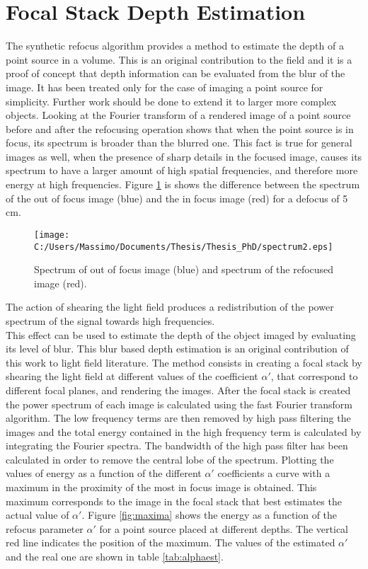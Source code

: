 \section{Focal Stack Depth Estimation} 
The synthetic refocus algorithm provides a method to estimate the depth of a point source in a volume. This is an original contribution to the field and it is a proof of concept that depth information can be evaluated from the blur of the image. It has been treated only for the case of imaging a point source for simplicity. Further work should be done to extend it to larger more complex objects. Looking at the Fourier transform of a rendered image of a point source before and after the refocusing operation shows that when the point source is in focus, its spectrum is broader than the blurred one. This fact is true for general images as well, when the presence of sharp details in the focused image, causes its spectrum to have a larger amount of high spatial frequencies, and therefore more energy at high frequencies. Figure \ref{fig:spec1} is shows the difference between the spectrum of the out of focus image (blue) and the in focus image (red) for a defocus of 5 cm.
\begin{figure}[H]
	\centering
	\texttt{[image: C:/Users/Massimo/Documents/Thesis/Thesis\_PhD/spectrum2.eps]}
	\caption{\label{fig:spec1} Spectrum of out of focus image (blue) and spectrum of the refocused image (red). }
\end{figure}
The action of shearing the light field produces a redistribution of the power spectrum of the signal towards high frequencies. \\
 This effect can be used to estimate the depth of the object imaged by evaluating its level of blur. This blur based depth estimation is an original contribution of this work to light field literature. The method consists in creating a focal stack by shearing the light field at different values of the coefficient $ \alpha'$, that correspond to different focal planes, and rendering the images. After the focal stack is created the power spectrum of each image is calculated using the fast Fourier transform algorithm. The low frequency terms are then removed by high pass filtering the images and the total energy contained in the high frequency term is calculated by integrating the Fourier spectra. The bandwidth of the high pass filter has been calculated in order to remove the central lobe of the spectrum. Plotting the values of energy as a function of the different $ \alpha'$ coefficients a curve with a maximum in the proximity of the most in focus image is obtained. This maximum corresponds to the image in the focal stack that best estimates the actual value of $ \alpha'$. Figure \ref{fig:maxima} shows the energy as a function of the refocus parameter $ \alpha'$ for a point source placed at different depths. The vertical red line indicates the position of the maximum. The values of the estimated $ \alpha'$ and the real one are shown in table \ref{tab:alphaest}.

